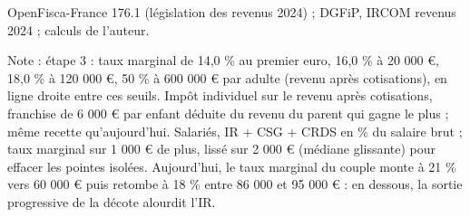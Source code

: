 OpenFisca-France 176.1 (législation des revenus 2024) ; DGFiP, IRCOM revenus 2024 ; calculs de l'auteur.\par Note : étape 3 : taux marginal de 14,0 \% au premier euro, 16,0 \% à 20 000 \euro{}, 18,0 \% à 120 000 \euro{}, 50 \% à 600 000 \euro{} par adulte (revenu après cotisations), en ligne droite entre ces seuils. Impôt individuel sur le revenu après cotisations, franchise de 6 000 \euro{} par enfant déduite du revenu du parent qui gagne le plus ; même recette qu'aujourd'hui. Salariés, IR + CSG + CRDS en \% du salaire brut ; taux marginal sur 1 000 \euro{} de plus, lissé sur 2 000 \euro{} (médiane glissante) pour effacer les pointes isolées. Aujourd'hui, le taux marginal du couple monte à 21 \% vers 60 000 \euro{} puis retombe à 18 \% entre 86 000 et 95 000 \euro{} : en dessous, la sortie progressive de la décote alourdit l'IR.
